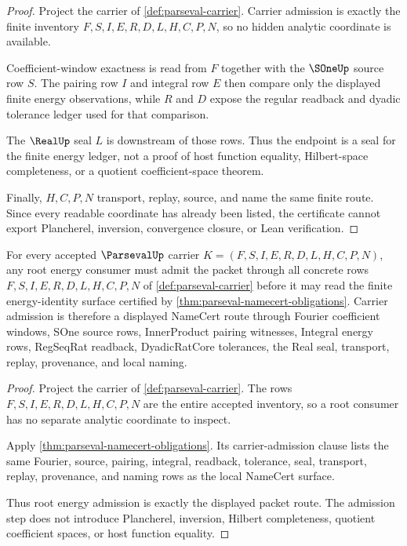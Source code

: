 \begin{proof}
Project the carrier of \autoref{def:parseval-carrier}. Carrier admission is exactly the finite inventory $F,S,I,E,R,D,L,H,C,P,N$, so no hidden analytic coordinate is available.

Coefficient-window exactness is read from $F$ together with the $\SOneUp$ source row $S$. The pairing row $I$ and integral row $E$ then compare only the displayed finite energy observations, while $R$ and $D$ expose the regular readback and dyadic tolerance ledger used for that comparison.

The $\RealUp$ seal $L$ is downstream of those rows. Thus the endpoint is a seal for the finite energy ledger, not a proof of host function equality, Hilbert-space completeness, or a quotient coefficient-space theorem.

Finally, $H,C,P,N$ transport, replay, source, and name the same finite route. Since every readable coordinate has already been listed, the certificate cannot export Plancherel, inversion, convergence closure, or Lean verification.
\end{proof}

\begin{theorem}
\label{thm:parseval-root-energy-carrier-admission}
For every accepted $\ParsevalUp$ carrier $K=(F,S,I,E,R,D,L,H,C,P,N)$, any root energy consumer must admit the packet through all concrete rows $F,S,I,E,R,D,L,H,C,P,N$ of \autoref{def:parseval-carrier} before it may read the finite energy-identity surface certified by \autoref{thm:parseval-namecert-obligations}. Carrier admission is therefore a displayed NameCert route through Fourier coefficient windows, SOne source rows, InnerProduct pairing witnesses, Integral energy rows, RegSeqRat readback, DyadicRatCore tolerances, the Real seal, transport, replay, provenance, and local naming.
\end{theorem}
\begin{proof}
Project the carrier of \autoref{def:parseval-carrier}. The rows $F,S,I,E,R,D,L,H,C,P,N$ are the entire accepted inventory, so a root consumer has no separate analytic coordinate to inspect.

Apply \autoref{thm:parseval-namecert-obligations}. Its carrier-admission clause lists the same Fourier, source, pairing, integral, readback, tolerance, seal, transport, replay, provenance, and naming rows as the local NameCert surface.

Thus root energy admission is exactly the displayed packet route. The admission step does not introduce Plancherel, inversion, Hilbert completeness, quotient coefficient spaces, or host function equality.
\end{proof}

